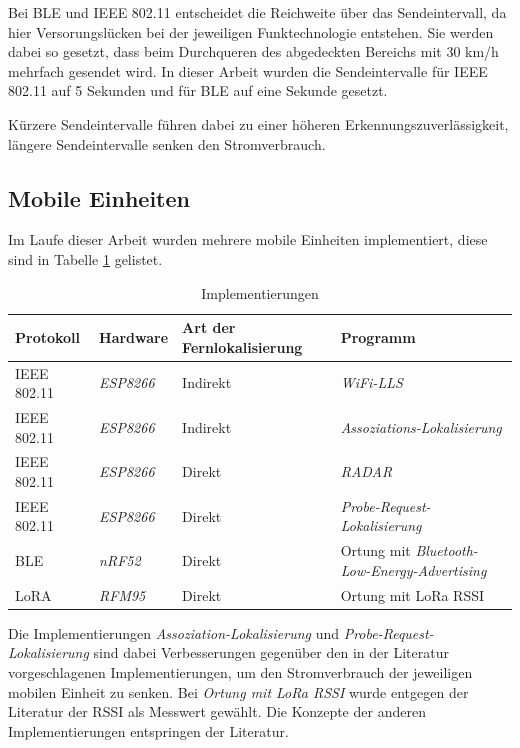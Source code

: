 Bei BLE und IEEE 802.11 entscheidet die Reichweite über das Sendeintervall, da hier Versorungslücken bei der jeweiligen Funktechnologie entstehen.
Sie werden dabei so gesetzt, dass beim Durchqueren des abgedeckten Bereichs mit 30 km/h mehrfach gesendet wird.
In dieser Arbeit wurden die Sendeintervalle für IEEE 802.11 auf 5 Sekunden und für BLE auf eine Sekunde gesetzt.

Kürzere Sendeintervalle führen dabei zu einer höheren Erkennungszuverlässigkeit, längere Sendeintervalle senken den Stromverbrauch.

\subsection{Mobile Einheiten}
Im Laufe dieser Arbeit wurden mehrere mobile Einheiten implementiert, diese sind in Tabelle \ref{table:implemen} gelistet.

\begin{table}[h]
	\centering
	\caption{Implementierungen}
	\label{table:implemen}
	\begin{tabular}{l|l|p{2.5cm}|p{5.8cm}}
		Protokoll & Hardware & Art der Fernlokalisierung & Programm \\
		\hline
		IEEE 802.11 & \emph{ESP8266} & Indirekt & \emph{WiFi-LLS} \cite{chen2007design} \\
		IEEE 802.11 & \emph{ESP8266} & Indirekt & \emph{Assoziations-Lokalisierung} \\
		\hline
		IEEE 802.11 & \emph{ESP8266} & Direkt & \emph{RADAR} \cite{bahl2000radar} \\
		IEEE 802.11 & \emph{ESP8266} & Direkt & \emph{Probe-Request-Lokalisierung} \\
		\hline
		BLE & \emph{nRF52} & Direkt & Ortung mit \emph{Bluetooth-Low-Energy-Advertising} \cite{jianyong2014rssi} \\
		\hline
		LoRA & \emph{RFM95} & Direkt & Ortung mit LoRa RSSI \\
	\end{tabular}
\end{table}

Die Implementierungen \emph{Assoziation-Lokalisierung} und \emph{Probe-Request-Lokalisierung} sind dabei Verbesserungen gegenüber den in der Literatur vorgeschlagenen Implementierungen, um den Stromverbrauch der jeweiligen mobilen Einheit zu senken.
Bei \emph{Ortung mit LoRa RSSI} wurde entgegen der Literatur der RSSI als Messwert gewählt.
Die Konzepte der anderen Implementierungen entspringen der Literatur.


